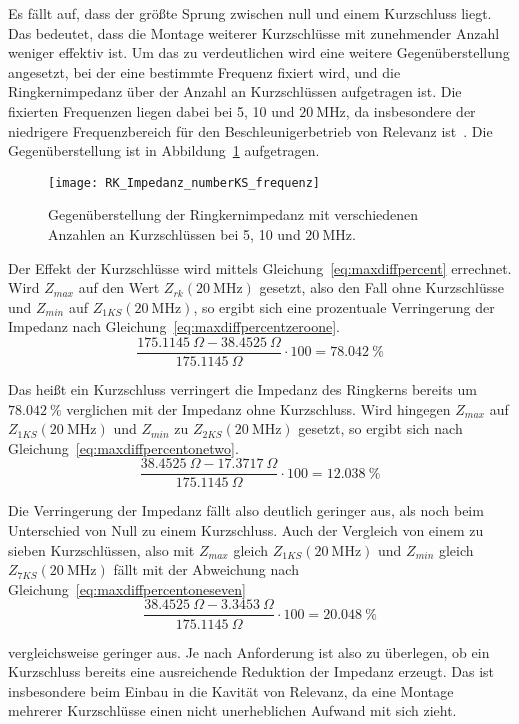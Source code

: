 \par
Es f\"allt auf, dass der gr\"o\ss{}te Sprung zwischen null und einem Kurzschluss liegt. Das bedeutet, dass die Montage weiterer Kurzschl\"usse mit zunehmender Anzahl weniger effektiv ist. Um das zu verdeutlichen wird eine weitere Gegen\"uberstellung angesetzt, bei der eine bestimmte Frequenz fixiert wird, und die Ringkernimpedanz \"uber der Anzahl an Kurzschl\"ussen aufgetragen ist. Die fixierten Frequenzen liegen dabei bei 5, 10 und $\SI{20}{\mega\hertz}$, da insbesondere der niedrigere Frequenzbereich f\"ur den Beschleunigerbetrieb von Relevanz ist~\citep{frey2015status}. Die Gegen\"uberstellung ist in Abbildung~\ref{fig:ringcorenumber20} aufgetragen.
\begin{figure}[htb]
	\centering
	\texttt{[image: RK\_Impedanz\_numberKS\_frequenz]}
	\caption{Gegen\"uberstellung der Ringkernimpedanz mit verschiedenen Anzahlen an Kurzschl\"ussen bei 5, 10 und $\SI{20}{\mega\hertz}$.}
	\label{fig:ringcorenumber20}
\end{figure}
\par
Der Effekt der Kurzschl\"usse wird mittels Gleichung~\ref{eq:maxdiffpercent} errechnet. Wird $Z_{max}$ auf den Wert $Z_{rk}(\SI{20}{\mega\hertz})$ gesetzt, also den Fall ohne Kurzschl\"usse und $Z_{min}$ auf $Z_{1KS}(\SI{20}{\mega\hertz})$, so ergibt sich eine prozentuale Verringerung der Impedanz nach Gleichung~\ref{eq:maxdiffpercentzeroone}.
\begin{equation}
	\frac{\SI{175,1145}{\Omega} - \SI{38,4525}{\Omega}}{\SI{175,1145}{\Omega}}\cdot 100 = \SI{78,042}{\%}
	\label{eq:maxdiffpercentzeroone}
\end{equation}
\par
Das hei\ss{}t ein Kurzschluss verringert die Impedanz des Ringkerns bereits um $\SI{78,042}{\%}$ verglichen mit der Impedanz ohne Kurzschluss. Wird hingegen $Z_{max}$ auf $Z_{1KS}(\SI{20}{\mega\hertz})$ und $Z_{min}$ zu $Z_{2KS}(\SI{20}{\mega\hertz})$ gesetzt, so ergibt sich nach Gleichung~\ref{eq:maxdiffpercentonetwo}.
\begin{equation}
	\frac{\SI{38,4525}{\Omega} - \SI{17,3717}{\Omega}}{\SI{175,1145}{\Omega}}\cdot 100 = \SI{12,038}{\%}
	\label{eq:maxdiffpercentonetwo}
\end{equation}
\par
Die Verringerung der Impedanz f\"allt also deutlich geringer aus, als noch beim Unterschied von Null zu einem Kurzschluss. Auch der Vergleich von einem zu sieben Kurzschl\"ussen, also mit $Z_{max}$ gleich $Z_{1KS}(\SI{20}{\mega\hertz})$ und $Z_{min}$ gleich $Z_{7KS}(\SI{20}{\mega\hertz})$ f\"allt mit der Abweichung nach Gleichung~\ref{eq:maxdiffpercentoneseven}
\begin{equation}
	\frac{\SI{38,4525}{\Omega} - \SI{3,3453}{\Omega}}{\SI{175,1145}{\Omega}}\cdot 100 = \SI{20,048}{\%}
	\label{eq:maxdiffpercentoneseven}
\end{equation}
\par
vergleichsweise geringer aus. Je nach Anforderung ist also zu \"uberlegen, ob ein Kurzschluss bereits eine ausreichende Reduktion der Impedanz erzeugt. Das ist insbesondere beim Einbau in die Kavit\"at von Relevanz, da eine Montage mehrerer Kurzschl\"usse einen nicht unerheblichen Aufwand mit sich zieht. 


